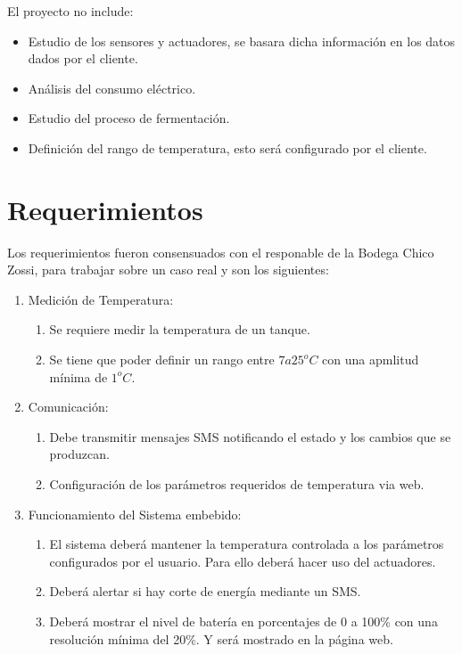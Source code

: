 El proyecto no include:
  \begin{itemize}
    \item Estudio de los sensores y actuadores, se basara dicha información en los datos dados por el cliente. 
    \item Análisis del consumo eléctrico.
    \item Estudio del proceso de fermentación.
    \item Definición del rango de temperatura, esto será configurado por el cliente.
  \end{itemize}

  \section{Requerimientos}

Los requerimientos fueron consensuados con el responable de la Bodega Chico Zossi, para trabajar sobre un caso real y son los siguientes:

\begin{enumerate}[label*=\arabic*.]
  \item Medición de Temperatura:
    \begin{enumerate}[label*=\arabic*.]
      \item Se requiere medir la temperatura de un tanque.
      \item Se tiene que poder definir un rango entre $7 a 25^oC$ con una apmlitud mínima de $1^oC$.
    \end{enumerate}
  \item Comunicación:
    \begin{enumerate}[label*=\arabic*.]
      \item Debe transmitir mensajes SMS notificando el estado y los cambios que se produzcan.
      \item Configuración de los parámetros requeridos de temperatura via web. 
    \end{enumerate}
  \item Funcionamiento del Sistema embebido:
    \begin{enumerate}[label*=\arabic*.]
      \item El sistema deberá mantener la temperatura controlada a los parámetros configurados por el usuario. Para ello deberá hacer uso del actuadores.
      \item Deberá alertar si hay corte de energía mediante un SMS.
      \item Deberá mostrar el nivel de batería en porcentajes de 0 a 100\%  con una resolución mínima del 20\%. Y será mostrado en la página web.
  \end{enumerate}
\end{enumerate}


